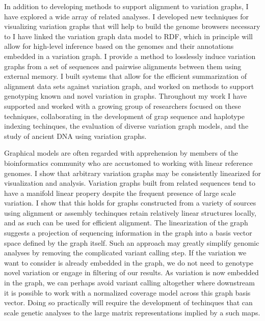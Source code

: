 In addition to developing methods to support alignment to variation graphs, I have explored a wide array of related analyses.
I developed new techniques for visualizing variation graphs that will help to build the genome browsers necessary to
I have linked the variation graph data model to RDF, which in principle will allow for high-level inference based on the genomes and their annotations embedded in a variation graph. 
I provide a method to losslessly induce variation graphs from a set of sequences and pairwise alignments between them using external memory.
I built systems that allow for the efficient summarization of alignment data sets against variation graph, and worked on methods to support genotyping known and novel variation in graphs.
Throughout my work I have supported and worked with a growing group of researchers focused on these techniques, collaborating in the development of grap sequence and haplotype indexing techinques, the evaluation of diverse variation graph models, and the study of ancient DNA using variation graphs.

Graphical models are often regarded with apprehension by members of the bioinformatics community who are accustomed to working with linear reference genomes.
I show that arbitrary variation graphs may be consistently linearized for visualization and analysis.
Variation graphs built from related sequences tend to have a manifold linear propery despite the frequent presence of large scale variation.
I show that this holds for graphs constructed from a variety of sources using alignment or assembly techinques retain relatively linear structures locally, and as such can be used for efficient alignment.
The linearization of the graph suggests a projection of sequencing information in the graph into a basis vector space defined by the graph itself.
Such an approach may greatly simplify genomic analyses by removing the complicated variant calling step.
If the variation we want to consider is already embedded in the graph, we do not need to genotype novel variation or engage in filtering of our results.
As variation is now embedded in the graph, we can perhaps avoid variant calling altogether where downstream it is possible to work with a normalized coverage model across this graph basis vector.
Doing so practically will require the development of techinques that can scale genetic analyses to the large matrix representations implied by a such maps.

